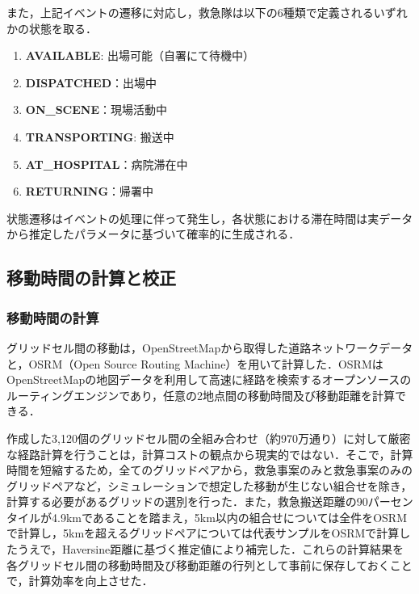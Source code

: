 また，上記イベントの遷移に対応し，救急隊は以下の6種類で定義されるいずれかの状態を取る．
\begin{enumerate}
\item \textbf{AVAILABLE}: 出場可能（自署にて待機中）
\item \textbf{DISPATCHED}：出場中
\item \textbf{ON\_SCENE}：現場活動中
\item \textbf{TRANSPORTING}: 搬送中
\item \textbf{AT\_HOSPITAL}：病院滞在中
\item \textbf{RETURNING}：帰署中
\end{enumerate}
状態遷移はイベントの処理に伴って発生し，各状態における滞在時間は実データから推定したパラメータに基づいて確率的に生成される．

\subsection{移動時間の計算と校正}
\label{移動時間の計算と校正}
\subsubsection{移動時間の計算}
グリッドセル間の移動は，OpenStreetMapから取得した道路ネットワークデータと，OSRM（Open Source Routing Machine）を用いて計算した．OSRMはOpenStreetMapの地図データを利用して高速に経路を検索するオープンソースのルーティングエンジンであり，任意の2地点間の移動時間及び移動距離を計算できる．

作成した3,120個のグリッドセル間の全組み合わせ（約970万通り）に対して厳密な経路計算を行うことは，計算コストの観点から現実的ではない．そこで，計算時間を短縮するため，全てのグリッドペアから，救急事案のみと救急事案のみのグリッドペアなど，シミュレーションで想定した移動が生じない組合せを除き，計算する必要があるグリッドの選別を行った．また，救急搬送距離の90パーセンタイルが4.9kmであることを踏まえ，5km以内の組合せについては全件をOSRMで計算し，5kmを超えるグリッドペアについては代表サンプルをOSRMで計算したうえで，Haversine距離\cite{sinnott1984}に基づく推定値により補完した．これらの計算結果を各グリッドセル間の移動時間及び移動距離の行列として事前に保存しておくことで，計算効率を向上させた．

